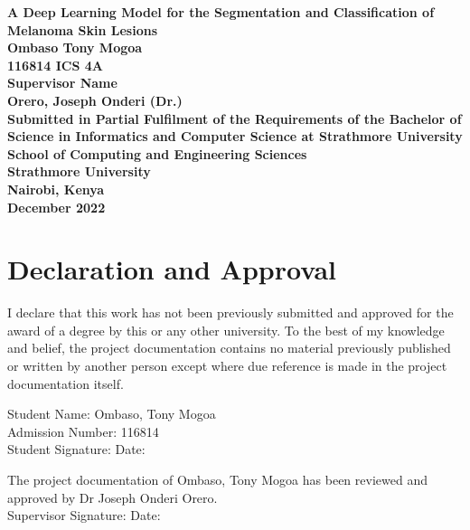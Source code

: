 \documentclass[12pt, a4paper]{article}
\begin{document}
\begin{center}
    \textbf{
    A Deep Learning Model for the Segmentation and Classification of Melanoma Skin Lesions\\
    \vspace{70pt}
    Ombaso Tony Mogoa\\
    116814
    ICS 4A\\
    \vspace{70pt}
    Supervisor Name\\
    Orero, Joseph Onderi (Dr.)\\
    \vspace{70pt}
    Submitted in Partial Fulfilment of the Requirements of the Bachelor of Science in Informatics and Computer Science at Strathmore University\\
    \vspace{70pt}
    School of Computing and Engineering Sciences\\
    Strathmore University\\
    Nairobi, Kenya\\
    \vspace{50pt}
    December 2022
    }
\end{center}

\thispagestyle{empty}
\clearpage
{}
\section*{Declaration and Approval}
I declare that this work has not been previously submitted and approved for the award of a degree by this or any other university. To the best of my knowledge and belief, the project documentation contains no material previously published or written by another person except where due reference is made in the project documentation itself.

\vspace{3cm}
Student Name: Ombaso, Tony Mogoa\\
Admission Number: 116814\\
Student Signature: \underline{\hspace{5cm}} Date: \underline{\hspace{5cm}}

\vspace{3cm}
The project documentation of Ombaso, Tony Mogoa has been reviewed and approved by Dr Joseph Onderi Orero.\\
Supervisor Signature: \underline{\hspace{5cm}} Date: \underline{\hspace{5cm}}
\clearpage
\end{document}
